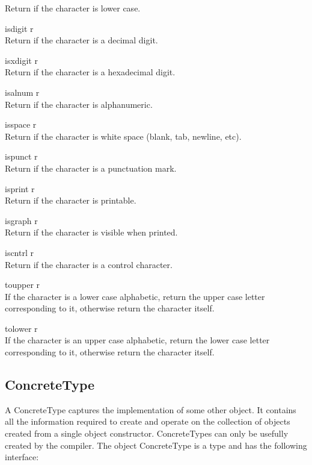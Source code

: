 \begin{desc}
    Return  if the character is lower case.
  \item[\kw{function} isdigit \returns{} \/\LB{}r \CO{} \tn{Boolean}\/\RB{}]~\\
    Return  if the character is a decimal digit.
  \item[\kw{function} isxdigit \returns{} \/\LB{}r \CO{} \tn{Boolean}\/\RB{}]~\\
    Return  if the character is a hexadecimal digit.
  \item[\kw{function} isalnum \returns{} \/\LB{}r \CO{} \tn{Boolean}\/\RB{}]~\\
    Return  if the character is alphanumeric.
  \item[\kw{function} isspace \returns{} \/\LB{}r \CO{} \tn{Boolean}\/\RB{}]~\\
    Return  if the character is white space (blank, tab, newline, etc).
  \item[\kw{function} ispunct \returns{} \/\LB{}r \CO{} \tn{Boolean}\/\RB{}]~\\
    Return  if the character is a punctuation mark.
  \item[\kw{function} isprint \returns{} \/\LB{}r \CO{} \tn{Boolean}\/\RB{}]~\\
    Return  if the character is printable.
  \item[\kw{function} isgraph \returns{} \/\LB{}r \CO{} \tn{Boolean}\/\RB{}]~\\
    Return  if the character is visible when printed.
  \item[\kw{function} iscntrl \returns{} \/\LB{}r \CO{} \tn{Boolean}\/\RB{}]~\\
    Return  if the character is a control character.
  \item[\kw{function} toupper \returns{} \/\LB{}r \CO{} \tn{Character}\/\RB{}]~\\
    If the character is a lower case alphabetic, return the upper case
    letter corresponding to it, otherwise return the character itself.
  \item[\kw{function} tolower \returns{} \/\LB{}r \CO{} \tn{Character}\/\RB{}]~\\
    If the character is an upper case alphabetic, return the lower case
    letter corresponding to it, otherwise return the character itself.
\end{desc}

\subsection{ConcreteType}
\label{builtin ConcreteType}
A ConcreteType captures the implementation of some other object.  It
contains all the information required to create and operate on the
collection of objects created from a single object constructor.
ConcreteTypes can only be usefully created by the compiler.
The object ConcreteType is a type and has the following interface:

